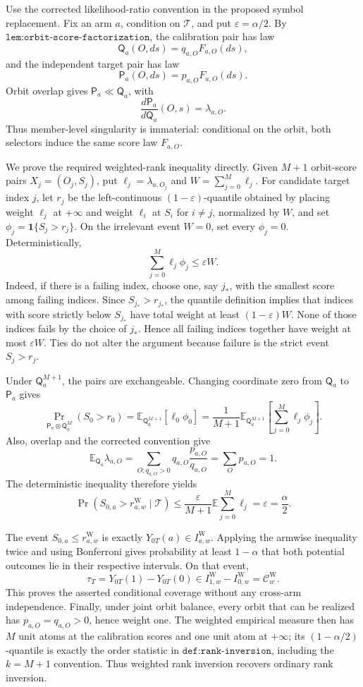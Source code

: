 Use the corrected likelihood-ratio convention in the proposed symbol replacement. Fix an arm \(a\), condition on \(\mathcal T\), and put \(\varepsilon=\alpha/2\). By \(\texttt{lem:orbit-score-factorization}\), the calibration pair has law \[\mathsf Q_a(O,ds)=q_{a,O}F_{a,O}(ds),\] and the independent target pair has law \[\mathsf P_a(O,ds)=p_{a,O}F_{a,O}(ds).\] Orbit overlap gives \(\mathsf P_a\ll\mathsf Q_a\), with \[\frac{d\mathsf P_a}{d\mathsf Q_a}(O,s)=\lambda_{a,O}.\] Thus member-level singularity is immaterial: conditional on the orbit, both selectors induce the same score law \(F_{a,O}\).

We prove the required weighted-rank inequality directly. Given \(M+1\) orbit-score pairs \(X_j=(O_j,S_j)\), put \(\ell_j=\lambda_{a,O_j}\) and \(W=\sum_{j=0}^M\ell_j\). For candidate target index \(j\), let \(r_j\) be the left-continuous \((1-\varepsilon)\)-quantile obtained by placing weight \(\ell_j\) at \(+\infty\) and weight \(\ell_i\) at \(S_i\) for \(i\ne j\), normalized by \(W\), and set \(\phi_j=\mathbf 1\{S_j>r_j\}\). On the irrelevant event \(W=0\), set every \(\phi_j=0\). Deterministically, \[\sum_{j=0}^M\ell_j\phi_j\le\varepsilon W.\] Indeed, if there is a failing index, choose one, say \(j_*\), with the smallest score among failing indices. Since \(S_{j_*}>r_{j_*}\), the quantile definition implies that indices with score strictly below \(S_{j_*}\) have total weight at least \((1-\varepsilon)W\). None of those indices fails by the choice of \(j_*\). Hence all failing indices together have weight at most \(\varepsilon W\). Ties do not alter the argument because failure is the strict event \(S_j>r_j\).

Under \(\mathsf Q_a^{M+1}\), the pairs are exchangeable. Changing coordinate zero from \(\mathsf Q_a\) to \(\mathsf P_a\) gives \[\Pr_{\mathsf P_a\otimes\mathsf Q_a^M}(S_0>r_0)=\mathbb E_{\mathsf Q_a^{M+1}}[\ell_0\phi_0]=\frac1{M+1}\mathbb E_{\mathsf Q_a^{M+1}}\!\left[\sum_{j=0}^M\ell_j\phi_j\right].\] Also, overlap and the corrected convention give \[\mathbb E_{\mathsf Q_a}\lambda_{a,O}=\sum_{O:q_{a,O}>0}q_{a,O}\frac{p_{a,O}}{q_{a,O}}=\sum_Op_{a,O}=1.\] The deterministic inequality therefore yields \[\Pr(S_{0,a}>r^{\mathrm W}_{a,w}\mid\mathcal T)\le\frac{\varepsilon}{M+1}\mathbb E\sum_{j=0}^M\ell_j=\varepsilon=\frac\alpha2.\]

The event \(S_{0,a}\le r^{\mathrm W}_{a,w}\) is exactly \(Y_{0T}(a)\in I^{\mathrm W}_{a,w}\). Applying the armwise inequality twice and using Bonferroni gives probability at least \(1-\alpha\) that both potential outcomes lie in their respective intervals. On that event, \[\tau_T=Y_{0T}(1)-Y_{0T}(0)\in I^{\mathrm W}_{1,w}-I^{\mathrm W}_{0,w}=\mathcal C^{\mathrm W}_w.\] This proves the asserted conditional coverage without any cross-arm independence. Finally, under joint orbit balance, every orbit that can be realized has \(p_{a,O}=q_{a,O}>0\), hence weight one. The weighted empirical measure then has \(M\) unit atoms at the calibration scores and one unit atom at \(+\infty\); its \((1-\alpha/2)\)-quantile is exactly the order statistic in \(\texttt{def:rank-inversion}\), including the \(k=M+1\) convention. Thus weighted rank inversion recovers ordinary rank inversion.